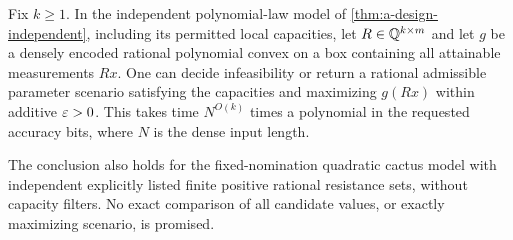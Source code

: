 \begin{theorem}
\label{thm:a-design-measurements}
Fix $k\ge1$.  In the independent polynomial-law model of
\cref{thm:a-design-independent}, including its permitted local
capacities, let $R\in\mathbb{Q}^{k\times m}$ and let $g$ be a densely encoded
rational polynomial convex on a box containing all attainable
measurements $Rx$.  One can decide infeasibility or return a
rational admissible parameter scenario
satisfying the capacities and maximizing $g(Rx)$ within additive
$\varepsilon>0$.  This takes time $N^{O(k)}$ times a polynomial in
the requested accuracy bits, where $N$ is the dense input length.

The conclusion also holds for the fixed-nomination quadratic cactus
model with independent explicitly listed finite positive rational
resistance sets, without capacity filters.  No exact comparison of
all candidate values, or exactly maximizing scenario, is promised.
\end{theorem}

